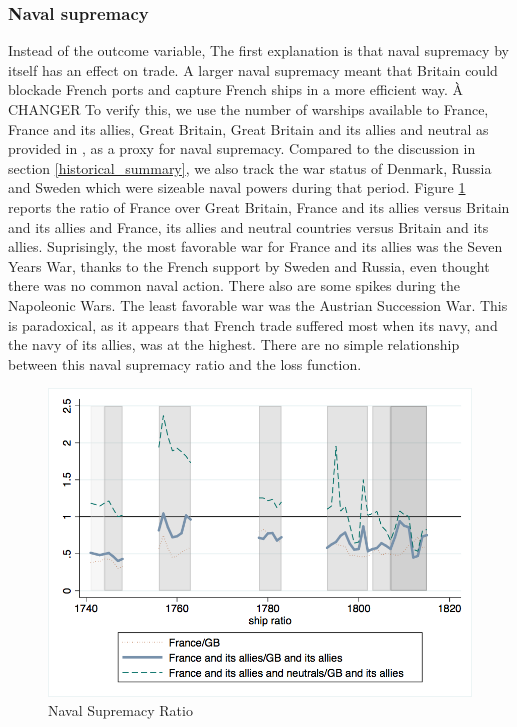 \documentclass[12pt,a4paper,notitlepage,english]{article}
\begin{document}
\subsubsection{Naval supremacy}
Instead of the outcome variable, The first explanation is that naval supremacy by itself has an effect on trade.
A larger naval supremacy meant that Britain could blockade French ports and capture French ships in a more efficient way.
À CHANGER
To verify this, we use the number of warships available to France, France and its allies, Great Britain, Great Britain and its allies and neutral as provided in \cite{Modelski1988}, as a proxy for naval supremacy.
Compared to the discussion in section \ref{historical_summary}, we also track the war status of Denmark, Russia and Sweden which were sizeable naval powers during that period.
Figure \ref{naval_supremacy_ratios} reports the ratio of France over Great Britain, France and its allies versus Britain and its allies and France, its allies and neutral countries versus Britain and its allies.
Suprisingly, the most favorable war for France and its allies was the Seven Years War, thanks to the French support by Sweden and Russia, even thought there was no common naval action.
There also are some spikes during the Napoleonic Wars.
The least favorable war was the Austrian Succession War. 
This is paradoxical, as it appears that French trade suffered most when its navy, and the navy of its allies, was at the highest.
There are no simple relationship between this naval supremacy ratio and the loss function. 
\begin{center}
\begin{figure}[H]
\caption{Naval Supremacy Ratio}
\label{naval_supremacy_ratios}
\centering
\includegraphics[scale=.51]{naval_supremacy_ratios.png}
\end{figure}
\end{center}
\end{document}
